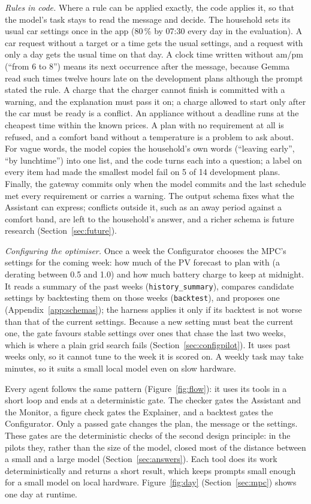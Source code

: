 \textit{Rules in code.} Where a rule can be applied exactly, the code
applies it, so that the model's task stays to read the message and
decide. The household sets its usual car settings once in the app
(80\,\% by 07:30 every day in the evaluation). A car request without a
target or a time gets the usual settings, and a request with only a day
gets the usual time on that day. A clock time written without am/pm
(``from 6 to 8'') means its next occurrence after the message, because
Gemma read such times twelve hours late on the development plans
although the prompt stated the rule. A charge that the charger cannot
finish is committed with a warning, and the explanation must pass it
on; a charge allowed to start only after the car must be ready is a
conflict. An appliance without a deadline runs at the cheapest time
within the known prices. A plan with no requirement at all is refused,
and a comfort band without a temperature is a problem to ask about. For
vague words, the model copies the household's own words (``leaving
early'', ``by lunchtime'') into one list, and the code turns each into
a question; a label on every item had made the smallest model fail on 5
of 14 development plans. Finally, the gateway commits only when the
model commits and the last schedule met every requirement or carries a
warning. The output schema fixes what the Assistant can express;
conflicts outside it, such as an away period against a comfort band,
are left to the household's answer, and a richer schema is future
research (Section~\ref{sec:future}).

\textit{Configuring the optimiser.} Once a week the Configurator
chooses the MPC's settings for the coming week: how much of the PV
forecast to plan with (a derating between 0.5 and 1.0) and how much
battery charge to keep at midnight. It reads a summary of the past
weeks (\texttt{history\_summary}), compares candidate settings by
backtesting them on those weeks (\texttt{backtest}), and proposes one
(Appendix~\ref{app:schemas});
the harness applies it only if its backtest is not worse than that of
the current settings. Because a new setting must beat the current one,
the gate favours stable settings over ones that chase the last two
weeks, which is where a plain grid search fails
(Section~\ref{sec:configpilot}). It uses past weeks only, so it
cannot tune to the week it is scored on. A weekly task may take minutes,
so it suits a small local model even on slow hardware.

Every agent follows the same pattern (Figure~\ref{fig:flow}): it uses
its tools in a short loop and ends at a deterministic gate. The checker
gates the Assistant and the Monitor, a figure check gates the Explainer,
and a backtest gates the Configurator. Only a passed gate changes the
plan, the message or the settings. These gates are the deterministic
checks of the second design principle: in the pilots they, rather than
the size of the model, closed most of the distance between a small and
a large model (Section~\ref{sec:answers}). Each tool does its work
deterministically and returns a short result, which keeps prompts small
enough for a small model on local hardware. Figure~\ref{fig:day}
(Section~\ref{sec:mpc}) shows one day at runtime.

